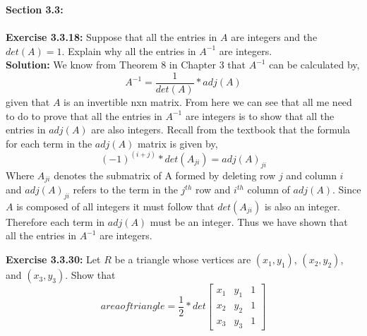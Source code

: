 \documentclass{amsart}
\begin{document}
{\huge\textbf{Section 3.3:}}\\\\
\noindent\textbf{Exercise 3.3.18: } Suppose that all the entries in $A$ are integers and the $det (A) = 1$. Explain why all the entries in $A^{-1}$ are integers. \\
\noindent \textbf{Solution: } We know from Theorem 8 in Chapter 3 that $A^{-1}$ can be calculated by,
\begin{equation*}
A^{-1} = \frac{1}{det(A)}*adj(A)
\end{equation*}
given that $A$ is an invertible nxn matrix. From here we can see that all me need to do to prove that all the entries in $A^{-1}$ are integers is to show that all the entries in $adj(A)$ are also integers. Recall from the textbook that the formula for each term in the $adj(A)$ matrix is given by,
\begin{equation*}
(-1)^{(i+j)}*det(A_{ji}) = adj(A)_{ji}
\end{equation*}
Where $A_{ji}$ denotes the submatrix of A formed by deleting row $j$ and column $i$ and $adj(A)_{ji}$ refers to the term in the $j^{th}$ row and $i^{th}$ column of $adj(A)$. Since $A$ is composed of all integers it must follow that $det(A_{ji})$ is also an integer. Therefore each term in $adj(A)$ must be an integer. Thus we have shown that all the entries in $A^{-1}$ are integers.

\vspace{1in}

\noindent\textbf{Exercise 3.3.30: } Let $R$ be a triangle whose vertices are $(x_1,y_1)$, $(x_2,y_2)$, and $(x_3,y_3)$. Show that
\begin{equation*}
{area of triangle} = \frac{1}{2}*det
\begin{bmatrix}
x_1&y_1&1\\
x_2&y_2&1\\
x_3&y_3&1
\end{bmatrix}
\end{equation*}
 
\end{document}
